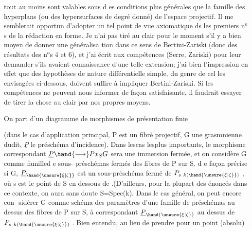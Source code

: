 
tout au moins sont valables sous d es conditions plus générales que  la
famille des hyperplans (ou des hypersurfaces de degré donné) de l'espace
projectif. Il me semblerait opportun d'adopter un tel point de vue
axiomatique ds les premiers n$^{\text{o}}$s de la rédaction en forme. Je n'ai pas
tiré au clair pour le moment s'il y a bien moyen de donner une généralisa%
tion dans ce sens de Bertini-Zariski (donc des résultats des n$^{\text{o}}$s 4 et 6),
et j'ai écrit aux compétences (Serre, Zariski) pour leur demander s'ils
avaient connaissance d'une telle extension; j'ai bien l'impression en
effet que des hypothèses de nature différentielle simple, du genre de cel
les envisagées ci-dessous, doivent suffire à impliquer Bertini-Zariski.
Si les compétences ne peuvent nous informer de façon satisfaisante, il
faudrait essayer de tirer la chose au clair par nos propres moyens.

On part d'un diagramme  de morphismes de présentation finie


(dans le cas d'application principal, P est un fibré projectif, G une
grasmnienne dudit, $\underline{P}$ le préschéma d'incidence). Dans lescas lesplus
importants, le morphisme correspondant $\underline{P} \hand{\longrightarrow} Px_S G$ sera une immersion
fermée, et on considère G comme   familled e sous-
préschémas fermés des fibres de P sur S, d e façon précise si \hand{\unsure{\xi|\zeta}} \hand{$\in$} G,
$\underline{P}_{\hand{\unsure{\xi|\zeta}}}$ est un sous-préschéma fermé de $P_{s\ k(\hand{\unsure{\xi|\zeta}})}$ , où s est le point de S en
dessous de \hand{\unsure{\xi|\zeta}} .(D'ailleurs, pour la plupart des énoncés dans ce contexte,
on aura sans doute S=Spec(k)\hand{)}. Dans le cas général, on peut encore con-%
sidérer G comme schéma des paramètres d'une famille de préschémas
au dessus des fibres de P sur S, à \hand{\unsure{\xi|\zeta}} correspondant $\underline{P}_{\hand{\unsure{\xi|\zeta}}}$ au dessus de
$P_{s\ k(\hand{\unsure{\xi|\zeta}})}$ . Bien entendu, au lieu de prendre pour \hand{\unsure{\xi|\zeta}} un point  (absolu)


